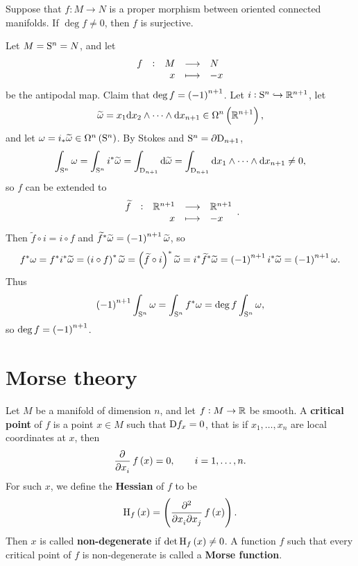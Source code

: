 \pagebreak

\begin{exercise*}
Suppose that $ f : M \to N $ is a proper morphism between oriented connected manifolds. If $ \deg f \ne 0 $, then $ f $ is surjective.
\end{exercise*}

\begin{example}
Let $ M = \S^n = N $, and let
$$ \function[f]{M}{N}{x}{-x} $$
be the antipodal map. Claim that $ \deg f = \br{-1}^{n + 1} $. Let $ i : \S^n \hookrightarrow \RR^{n + 1} $, let
$$ \widetilde{\omega} = x_1\d x_2 \wedge \dots \wedge \d x_{n + 1} \in \Omega^n\br{\RR^{n + 1}}, $$
and let $ \omega = i_*\widetilde{\omega} \in \Omega^n\br{\S^n} $. By Stokes and $ \S^n = \partial\D_{n + 1} $,
$$ \int_{\S^n} \omega = \int_{\S^n} i^*\widetilde{\omega} = \int_{\D_{n + 1}} \d\widetilde{\omega} = \int_{\D_{n + 1}} \d x_1 \wedge \dots \wedge \d x_{n + 1} \ne 0, $$
so $ f $ can be extended to
$$ \function[\widetilde{f}]{\RR^{n + 1}}{\RR^{n + 1}}{x}{-x}. $$
Then $ \widetilde{f} \circ i = i \circ f $ and $ \widetilde{f}^*\widetilde{\omega} = \br{-1}^{n + 1}\widetilde{\omega} $, so
$$ f^*\omega = f^*i^*\widetilde{\omega} = \br{i \circ f}^*\widetilde{\omega} = \br{\widetilde{f} \circ i}^*\widetilde{\omega} = i^*\widetilde{f}^*\widetilde{\omega} = \br{-1}^{n + 1}i^*\widetilde{\omega} = \br{-1}^{n + 1}\omega. $$
Thus
$$ \br{-1}^{n + 1}\int_{\S^n} \omega = \int_{\S^n} f^*\omega = \deg f\int_{\S^n} \omega, $$
so $ \deg f = \br{-1}^{n + 1} $.
\end{example}

\pagebreak

\section{Morse theory}

\begin{definition}
Let $ M $ be a manifold of dimension $ n $, and let $ f : M \to \RR $ be smooth. A \textbf{critical point} of $ f $ is a point $ x \in M $ such that $ \D f_x = 0 $, that is if $ x_1, \dots, x_n $ are local coordinates at $ x $, then
$$ \dpd{}{x_i}f\br{x} = 0, \qquad i = 1, \dots, n. $$
For such $ x $, we define the \textbf{Hessian} of $ f $ to be
$$ \H_f\br{x} = \br{\dmd{}{2}{x_i}{}{x_j}{}f\br{x}}. $$
Then $ x $ is called \textbf{non-degenerate} if $ \det \H_f\br{x} \ne 0 $. A function $ f $ such that every critical point of $ f $ is non-degenerate is called a \textbf{Morse function}.
\end{definition}

